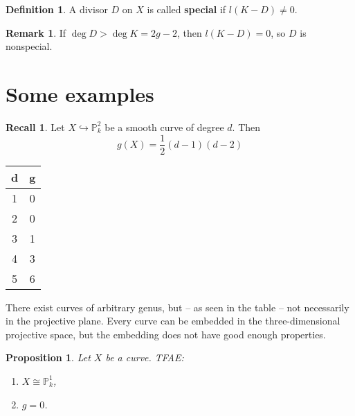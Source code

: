 \documentclass[12pt]{article}
\newtheorem*{proposition}{Proposition}
\theoremstyle{definition}
\newtheorem*{definition}{Definition}
\newtheorem*{remark}{Remark}
\newtheorem*{recall}{Recall}
\begin{document}
\begin{definition}
A divisor $D$ on $X$ is called \textbf{special} if $l(K-D)\neq0$.
\end{definition}

\begin{remark}
If $\deg D>\deg K=2g-2$, then $l(K-D)=0$, so $D$ is nonspecial.
\end{remark}

\section{Some examples}
\begin{recall}
Let $X\hookrightarrow\mathbb P_k^2$ be a smooth curve of degree $d$. Then
\begin{equation}\tag{genus formula}
g(X)=\frac12(d-1)(d-2)
\end{equation}
\end{recall}

\begin{table}
\centering
\begin{tabular}{c|c}
d&g\\\hline1&0\\2&0\\3&1\\4&3\\5&6
\end{tabular}
\end{table}

There exist curves of arbitrary genus, but -- as seen in the table -- not necessarily in the projective plane. Every curve can be embedded in the three-dimensional projective space, but the embedding does not have good enough properties.

\begin{proposition}
Let $X$ be a curve. TFAE:
\begin{enumerate}[label=\arabic*)]
\item\label{genus_line} $X\cong\mathbb P_k^1$,
\item\label{g=0} $g=0$.
\end{enumerate}
\end{proposition}
\end{document}
